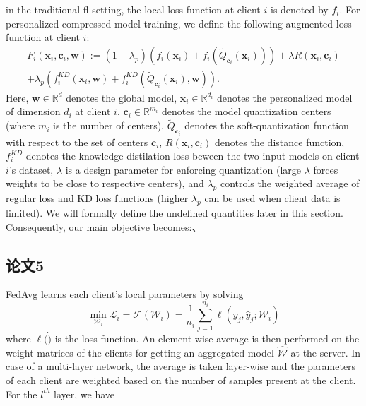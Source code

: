 in the traditional \acs{fl} setting, the local loss function at client $i$ is denoted by $f_i$. For personalized compressed model training, we define the following augmented loss function at client $i$:
\begin{equation*}
    \begin{split}
    F_i(\mathbf{x}_i,\mathbf{c}_i,\mathbf{w}):=(1-\lambda_p)\left(f_i(\mathbf{x}_i)+f_i(\widetilde{Q}_{\mathbf{c}_i}(\mathbf{x}_i))\right)+\lambda R(\mathbf{x}_i,\mathbf{c}_i)\\
    +\lambda_p\left(f_i^{KD}(\mathbf{x}_i,\mathbf{w})+f_i^{KD}(\widetilde{Q}_{\mathbf{c}_i}(\mathbf{x}_i),\mathbf{w})\right).
    \end{split}
\end{equation*}
Here, $\mathbf{w}\in\mathbb{R}^d$ denotes the global model, $\mathbf{x}_i\in\mathbb{R}^{d_i}$ denotes the personalized model of dimension $d_i$ at client $i$, $\mathbf{c}_i\in\mathbb{R}^{m_i}$ denotes the model quantization centers (where $m_i$ is the number of centers), $\widetilde{Q}_{\mathbf{c}_i}$ denotes the soft-quantization function with respect to the set of centers $\mathbf{c}_i$, $R(\mathbf{x}_i, \mathbf{c}_i)$ denotes the distance function, $f_i^{KD}$ denotes the knowledge distilation loss beween the two input models on client $i$’s dataset, $\lambda$ is a design parameter for enforcing quantization (large $\lambda$ forces weights to be close to respective centers), and $\lambda_p$ controls the weighted average of regular loss and KD loss functions (higher $\lambda_p$ can be used when client data is limited). We will formally define the undefined quantities later in this section. Consequently, our main objective becomes:、

\subsection{论文5}
FedAvg learns each client's local parameters by solving
\begin{equation*}
    \min_{\mathcal{W}_i}\mathcal{L}_i=\mathcal{F}(\mathcal{W}_i)=\frac1{n_i}\sum_{j=1}^{n_i}\ell(y_j,\hat{y}_j;\mathcal{W}_i)
\end{equation*}
where $\ell(\dot)$ is the loss function. An element-wise average is then performed on the weight matrices of the clients for getting an aggregated model $\hat{\mathcal{W}}$ at the server. In case of a multi-layer network, the average is taken layer-wise and the parameters of each client are weighted based on the number of samples present at the client. For the $l^{th}$ layer, we have

